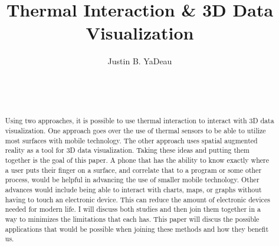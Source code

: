 \documentclass{sig-alternate}
\begin{document}

\title{Thermal Interaction \& 3D Data Visualization}


\author{
\alignauthor
Justin B. YaDeau\\
	\\
	\\
	\\
}

\maketitle

\begin{abstract}
Using two approaches, it is possible to use thermal interaction to interact with 3D data visualization. One approach goes over the use of thermal sensors to be able to utilize most surfaces with mobile technology. The other approach uses spatial augmented reality as a tool for 3D data visualization. Taking these ideas and putting them together is the goal of this paper. A phone that has the ability to know exactly where a user puts their finger on a surface, and correlate that to a program or some other process, would be helpful in advancing the use of smaller mobile technology. Other advances would include being able to interact with charts, maps, or graphs without having to touch an electronic device. This can reduce the amount of electronic devices needed for modern life. I will discuss both studies and then join them together in a way to minimizes the limitations that each has. This paper will discus the possible applications that would be possible when joining these methods and how they benefit us.
\end{abstract}

\end{document}
